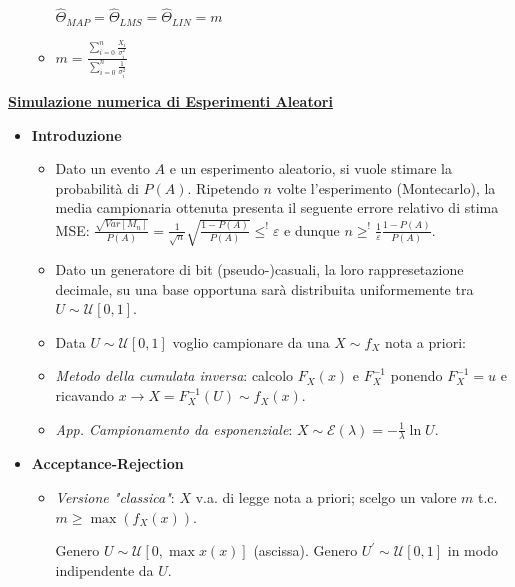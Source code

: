 \documentclass[8pt]{extarticle}
\begin{document}
\begin{multicols*}{3}
\begin{itemize}
\begin{itemize}
                $\hat{\Theta}_{MAP}=\hat{\Theta}_{LMS}=\hat{\Theta}_{LIN}=m$
                \item $m=\frac{\sum_{i=0}^{n}\frac{X_{i}}{\sigma_{i}^{2}}}{\sum_{i=0}^{n}\frac{1}{\sigma_{i}^{2}}}$
            \end{itemize}
    \end{itemize}

    \textbf{\underline{Simulazione numerica di Esperimenti Aleatori}}
    \begin{itemize}
        \item \textbf{Introduzione}
              \begin{itemize}
                  \item Dato un evento $A$ e un esperimento aleatorio, si vuole stimare la probabilità di $P(A)$. Ripetendo $n$ volte l'esperimento (Montecarlo), la media campionaria ottenuta presenta il seguente errore relativo di stima MSE: \newline $\frac{\sqrt{Var[M_{n}]}}{P(A)}=\frac{1}{\sqrt{n}}\sqrt{\frac{1-P(A)}{P(A)}}\leq^{!}\varepsilon$ e dunque $n \geq^{!}\frac{1}{\varepsilon}\frac{1-P(A)}{P(A)}$.
                  \item Dato un generatore di bit (pseudo-)casuali, la loro rappresetazione decimale, su una base opportuna sarà distribuita uniformemente tra $U\sim\mathcal{U}[0,1]$.
                  \item Data $U\sim\mathcal{U}[0,1]$ voglio campionare da una $X\sim f_{X}$ nota a priori:
                  \item \textit{Metodo della cumulata inversa}: calcolo $F_{X}(x)$ e $F_{X}^{-1}$ ponendo $F_{X}^{-1} = u$ e ricavando $x \rightarrow X = F_{X}^{-1}(U) \sim f_{X}(x)$.
                  \item \textit{App. Campionamento da esponenziale}: $X\sim\mathcal{E}(\lambda)=-\frac{1}{\lambda}\ln{U}$.
              \end{itemize}
        \item \textbf{Acceptance-Rejection}
              \begin{itemize}
                  \item \textit{Versione "classica"}: $X$ v.a. di legge nota a priori; scelgo un valore $m$ t.c. $m\ge \max{}(f_{X}(x))$.
                        \begin{algorithmic}[1]
                            \State Genero $U\sim\mathcal{U}[0,\max{x}(x)]$ (ascissa).
                            \State Genero $U^{'}\sim\mathcal{U}[0,1]$ in modo indipendente da $U$.

\end{algorithmic}
\end{itemize}
\end{itemize}
\end{multicols*}
\end{document}
